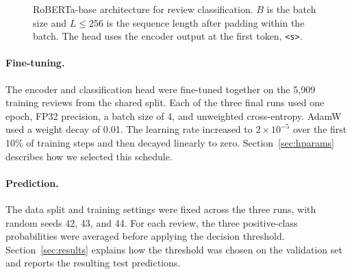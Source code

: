 \begin{figure}[!htbp]
\centering
{}
\caption{RoBERTa-base architecture for review classification.
$B$ is the batch size and $L \leq 256$ is the sequence length
after padding within the batch. The head uses the encoder output
at the first token, \texttt{\textless s\textgreater}.}
\label{fig:c-roberta}
\end{figure}

\paragraph{Fine-tuning.}
The encoder and classification head were fine-tuned together on the
5,909 training reviews from the shared split. Each of the three final
runs used one epoch, FP32 precision, a batch size of 4, and unweighted
cross-entropy. AdamW used a weight decay of 0.01. The learning rate
increased to \(2 \times 10^{-5}\) over the first 10\% of training
steps and then decayed linearly to zero. Section~\ref{sec:hparams} describes how
we selected this schedule.

\paragraph{Prediction.}
The data split and training settings were fixed across the three
runs, with random seeds 42, 43, and 44. For each review, the three
positive-class probabilities were averaged before applying the
decision threshold. Section~\ref{sec:results} explains how the threshold was chosen
on the validation set and reports the resulting test predictions.